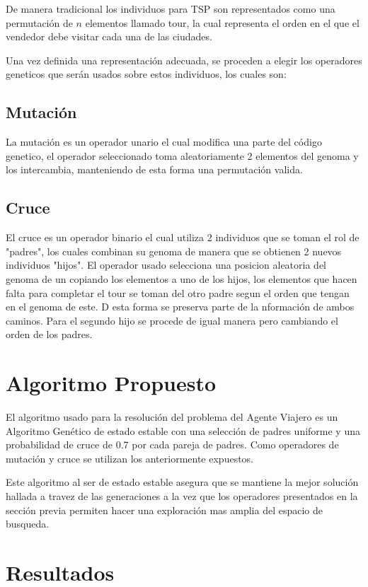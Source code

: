 \documentclass[twocolumn]{IEEEtran}
\begin{document}
De manera tradicional los individuos para TSP son representados como una permutación de $n$
elementos llamado tour, la cual representa el orden en el que el vendedor debe visitar
cada una de las ciudades.

Una vez definida una representación adecuada, se proceden a elegir los operadores geneticos que
serán usados sobre estos individuos, los cuales son:

\subsection{Mutación}
La mutación es un operador unario el cual modifica una parte del código genetico, el operador
seleccionado toma aleatoriamente 2 elementos del genoma y los intercambia, manteniendo de esta
forma una permutación valida. 

\subsection{Cruce}
El cruce es un operador binario el cual utiliza 2 individuos que se toman el rol de "padres",
los cuales combinan su genoma de manera que se obtienen 2 nuevos individuos "hijos".
El operador usado selecciona una posicion aleatoria del genoma de un copiando los elementos 
a uno de los hijos, los elementos que hacen falta para completar el tour se toman 
del otro padre segun el orden que tengan en el genoma de este. D esta forma se preserva parte de
la nformación de ambos caminos. Para el segundo hijo se procede de igual manera pero cambiando
el orden de los padres.

\section{Algoritmo Propuesto}

El algoritmo usado para la resolución del problema del Agente Viajero es un Algoritmo Genético
de estado estable con una selección de padres uniforme y una probabilidad de cruce de 0.7 
por cada pareja de padres. Como operadores de mutación y cruce se utilizan los anteriormente expuestos.

Este algoritmo al ser de estado estable asegura que se mantiene la mejor solución hallada a travez
de las generaciones a la vez que los operadores presentados en la sección previa permiten hacer una
exploración mas amplia del espacio de busqueda.

\section{Resultados}
\end{document}
